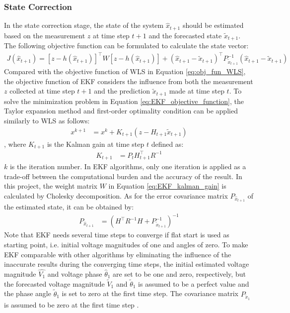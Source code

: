 \subsubsection{State Correction}
In the state correction stage, the state of the system $\hat{x}_{t+1}$ should be estimated based on the measurement $z$ at time step $t+1$ and the forecasted state $\widetilde{x}_{t+1}$. The following objective function can be formulated to calculate the state vector:
\begin{align}
    J(\hat{x}_{t+1})=[z-h(\hat{x}_{t+1})]^\intercal W [z-h(\hat{x}_{t+1})] + (\hat{x}_{t+1}-\widetilde{x}_{t+1})^\intercal P^{-1}_{\widetilde{x}_{t+1}} (\hat{x}_{t+1}-\widetilde{x}_{t+1})
    \label{eq:EKF_objective_function}
\end{align}
Compared with the objective function of WLS in Equation \ref{eq:obj_fun_WLS}, the objective function of EKF considers the influence from both the measurement $z$ collected at time step $t+1$ and the prediction $\widetilde{x}_{t+1}$ made at time step $t$. To solve the minimization problem in Equation \ref{eq:EKF_objective_function}, the Taylor expansion method and first-order optimality condition can be applied similarly to WLS as follows:
\begin{align}
    x^{k+1} &= x^k +K_{t+1} (z-H_{t+1} \widetilde{x}_{t+1})
    \label{eq:EKF_first_order}
\end{align}
, where $K_{t+1}$ is the Kalman gain at time step $t$ defined as:
\begin{align}
    K_{t+1} &= P_t H_{t+1}^{\intercal} R^{-1}
    \label{eq:EKF_kalman_gain}
\end{align}
$k$ is the iteration number. In EKF algorithms, only one iteration is applied as a trade-off between the computational burden and the accuracy of the result. In this project, the weight matrix $W$ in Equation \ref{eq:EKF_kalman_gain} is calculated by Cholesky decomposition. As for the error covariance matrix $P_{\hat{x}_{t+1}}$ of the estimated state, it can be obtained by:
\begin{align}
    P_{\hat{x}_{t+1}} &= \left(H^\intercal R^{-1} H + P_{\widetilde{x}_{t+1}}^{-1} \right)^{-1}
    \label{eq:estimated_state_covraicne_matrix}
\end{align}
Note that EKF needs several time steps to converge if flat start is used as starting point, i.e. initial voltage magnitudes of one and angles of zero. To make EKF comparable with other algorithms by eliminating the influence of the inaccurate results during the converging time steps, the initial estimated voltage magnitude $\hat{V_1}$ and voltage phase $\hat{\theta}_1$ are set to be one and zero, respectively, but the forecasted voltage magnitude $\widetilde{V}_1$ and $\widetilde{\theta}_1$ is assumed to be a perfect value and the phase angle $\widetilde{\theta}_1$ is set to zero at the first time step. The covariance matrix $P_{\widetilde{x}_1}$ is assumed to be zero at the first time step \cite{jaman2017implementation}. 

